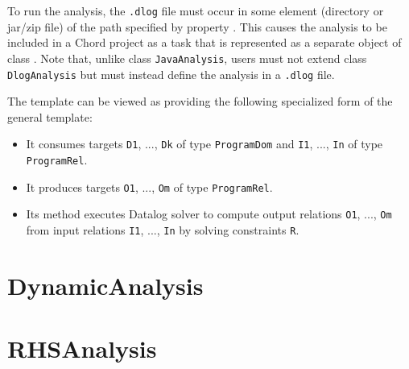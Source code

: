 To run the analysis, the {\tt .dlog} file must occur in some element (directory
or jar/zip file) of the path specified by property .
 This causes the analysis to be included in a Chord project as a task that is
represented as a separate object of class
.
Note that, unlike class {\tt JavaAnalysis}, users must not extend class
{\tt DlogAnalysis} but must instead define the analysis in a {\tt .dlog} file.

The  template can be viewed as providing the following
specialized form of the general  template:
\begin{itemize}
\item
It consumes targets {\tt D1}, ..., {\tt Dk} of type {\tt ProgramDom} and
{\tt I1}, ..., {\tt In} of type {\tt ProgramRel}.
\item
It produces targets {\tt O1}, ..., {\tt Om} of type {\tt ProgramRel}.
\item
Its  method executes Datalog solver  to compute output
relations {\tt O1}, ..., {\tt Om} from input relations {\tt I1}, ..., {\tt In}
by solving constraints {\tt R}.
\end{itemize}

\section{DynamicAnalysis}
\label{sec:dynamic-analysis}

\section{RHSAnalysis}
\label{sec:rhs-analysis}

